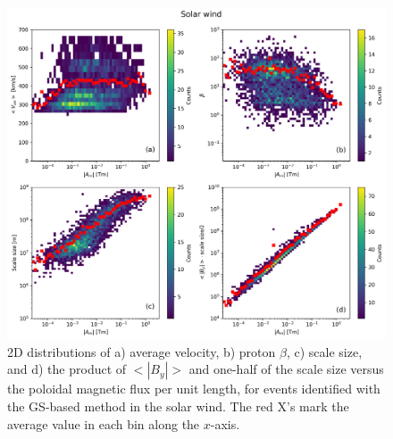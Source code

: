 \begin{figure}[ht!]
    \centering
    \includegraphics[width=\textwidth]{Figures/GS analysis/heatmap_solarwind.png}
    \caption[2D distributions of various parameters vs. $|A_m|$ in the solar wind]{2D distributions of a) average velocity, b) proton $\beta$, c) scale size, and d) the product of $<|B_y|>$ and one-half of the scale size versus the poloidal magnetic flux per unit length, for events identified with the GS-based method in the solar wind. The red X's mark the average value in each bin along the $x$-axis.}
    \label{fig:heatmap-solarwind}
\end{figure}

